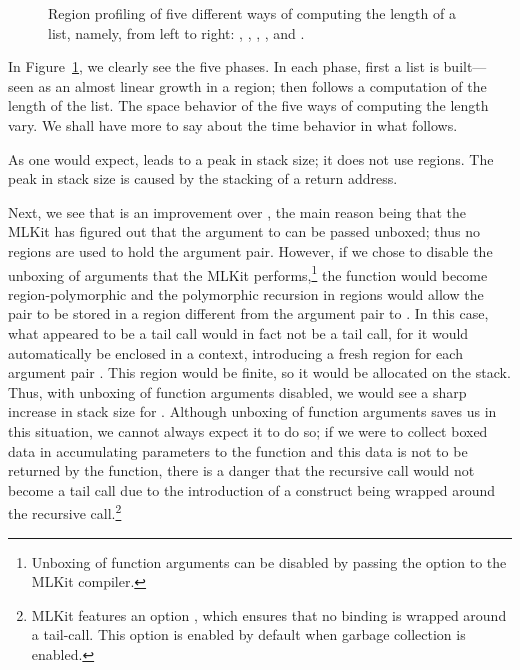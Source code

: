 \documentclass[12pt]{book}
\begin{document}
\begin{figure}
\caption{Region profiling of five different ways of computing the length of a
  list, namely, from left to right: , , ,
  , and .}
\label{length.region.fig}
\end{figure}

In Figure~\ref{length.region.fig}, we clearly see the five phases.  In each
phase, first a list is built---seen as an almost linear growth in a region; then
follows a computation of the length of the list.  The space behavior of the five
ways of computing the length vary. We shall have more to say about the time
behavior in what follows.

As one would expect,  leads to a peak in stack size; it does not use
regions. The peak in stack size is caused by the stacking of a return address.

Next, we see that  is an improvement over , the main
reason being that the MLKit has figured out that the argument to 
can be passed unboxed; thus no regions are used to hold the argument
pair. However, if we chose to disable the unboxing of arguments that the MLKit
performs,\footnote{Unboxing of function arguments can be disabled by passing the
option  to the MLKit compiler.} the function would
become region-polymorphic and the polymorphic recursion in regions would allow
the pair  to be stored in a region different from the
argument pair to . In this case, what appeared to be a tail call
would in fact not be a tail call, for it would automatically be enclosed in a
 context, introducing a fresh region for each argument pair
.  This region would be finite, so it would be allocated on the
stack.  Thus, with unboxing of function arguments disabled, we would see a sharp
increase in stack size for . Although unboxing of function
arguments saves us in this situation, we cannot always expect it to do so; if we
were to collect boxed data in accumulating parameters to the function and this
data is not to be returned by the function, there is a danger that the recursive
call would not become a tail call due to the introduction of a 
construct being wrapped around the recursive call.\footnote{MLKit features
an option , which ensures that no 
binding is wrapped around a tail-call. This option is enabled by default when
garbage collection is enabled.}
\end{document}
